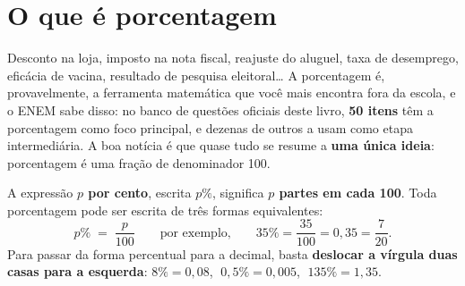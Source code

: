 
\section{O que é porcentagem}

Desconto na loja, imposto na nota fiscal, reajuste do aluguel, taxa de
desemprego, eficácia de vacina, resultado de pesquisa eleitoral\ldots{} A
porcentagem é, provavelmente, a ferramenta matemática que você mais encontra
fora da escola, e o ENEM sabe disso: no banco de questões oficiais deste livro,
\textbf{50 itens} têm a porcentagem como foco principal, e dezenas de outros a
usam como etapa intermediária. A boa notícia é que quase tudo se resume a
\textbf{uma única ideia}: porcentagem é uma fração de denominador 100.

\begin{definicao}[Porcentagem]
A expressão \textbf{$p$ por cento}, escrita $p\%$, significa \textbf{$p$ partes em
cada 100}. Toda porcentagem pode ser escrita de três formas equivalentes:
\[
  p\% \;=\; \frac{p}{100} \qquad\text{por exemplo,}\qquad
  35\% = \frac{35}{100} = 0{,}35 = \frac{7}{20}.
\]
Para passar da forma percentual para a decimal, basta \textbf{deslocar a vírgula
duas casas para a esquerda}: $8\% = 0{,}08$, $\;0{,}5\% = 0{,}005$,
$\;135\% = 1{,}35$.
\end{definicao}

\begin{center}
\end{center}

